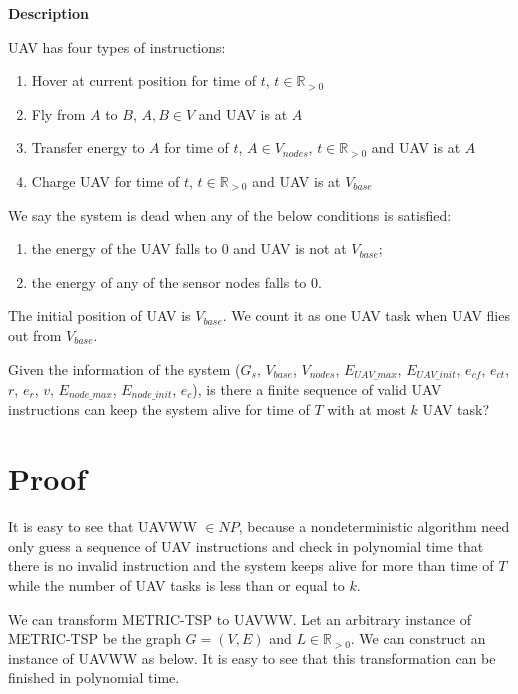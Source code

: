 \documentclass[11pt]{article}
\begin{document}
\noindent
\textbf{Description}

UAV has four types of instructions:
\begin{enumerate}[noitemsep]
\item Hover at current position for time of $t$, $t \in \mathbb{R}_{>0}$
\item Fly from $A$ to $B$, $A,B \in V$ and UAV is at $A$
\item Transfer energy to $A$ for time of $t$, $A \in V_{nodes}$, $t \in \mathbb{R}_{>0}$ and UAV is at $A$
\item Charge UAV for time of $t$, $t \in \mathbb{R}_{>0}$ and UAV is at $V_{base}$
\end{enumerate}

We say the system is dead when any of the below conditions is satisfied:
\begin{enumerate}[noitemsep]
\item the energy of the UAV falls to 0 and UAV is not at $V_{base}$;
\item the energy of any of the sensor nodes falls to 0.
\end{enumerate}

The initial position of UAV is $V_{base}$. We count it as one UAV task when UAV flies out from $V_{base}$.

Given the information of the system ($G_s$, $V_{base}$, $V_{nodes}$, $E_{UAV\_max} $, $E_{UAV\_init}$, $e_{cf}$, $e_{ct}$, $r$, $e_r$, $v$, $E_{node\_max}$, $E_{node\_init}$, $e_{c}$), is there a finite sequence of valid UAV instructions can keep the system alive for time of $T$ with at most $k$ UAV task?

\section{Proof}
It is easy to see that UAVWW $\in NP$, because a nondeterministic algorithm need only guess a sequence of UAV instructions and check in polynomial time that there is no invalid instruction and the system keeps alive for more than time of $T$ while the number of UAV tasks is less than or equal to $k$.

We can transform METRIC-TSP to UAVWW. Let an arbitrary instance of METRIC-TSP be the graph $G = (V, E)$ and $L \in \mathbb{R}_{>0}$. We can construct an instance of UAVWW as below. It is easy to see that this transformation can be finished in polynomial time.
\end{document}
